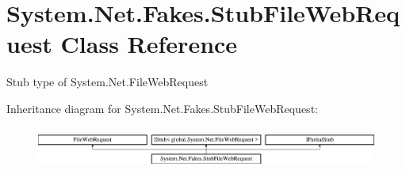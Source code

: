 \hypertarget{class_system_1_1_net_1_1_fakes_1_1_stub_file_web_request}{\section{System.\-Net.\-Fakes.\-Stub\-File\-Web\-Request Class Reference}
\label{class_system_1_1_net_1_1_fakes_1_1_stub_file_web_request}
}


Stub type of System.\-Net.\-File\-Web\-Request 


Inheritance diagram for System.\-Net.\-Fakes.\-Stub\-File\-Web\-Request\-:\begin{figure}[H]
\begin{center}
\leavevmode
\includegraphics[height=1.398252cm]{class_system_1_1_net_1_1_fakes_1_1_stub_file_web_request}
\end{center}
\end{figure}
